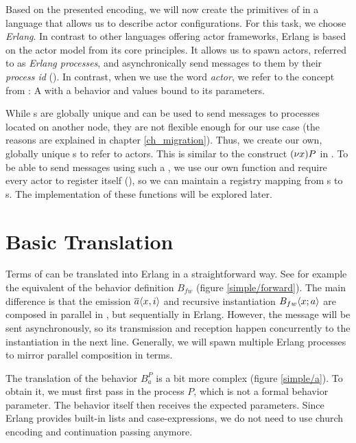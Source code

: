 Based on the presented encoding,
we will now create the primitives of \corejoincalc
in a language that allows us to describe actor configurations.
For this task, we choose \emph{Erlang}.
In contrast to other languages offering actor frameworks,
Erlang is based on the actor model from its core principles.
It allows us to spawn actors, referred to as \emph{Erlang processes},
and asynchronically send messages to them by their \emph{process id} (\PID).
In contrast, when we use the word \emph{actor},
we refer to the concept from \actorpicalc:
A \actorname with a behavior and values bound to its parameters.

While \PID{}s are globally unique and can be used to send messages to
processes located on another node,
they are not flexible enough for our use case
(the reasons are explained in chapter \ref{ch_migration}).
Thus, we create our own, globally unique \actorname{}s to refer to actors.
This is similar to the construct $\anew{x}{P}$ in \actorpicalc.
To be able to send messages using such a \actorname,
we use our own  function and require every actor to register itself
(),
so we can maintain a registry mapping from \actorname{}s to \PID{}s.
The implementation of these functions will be explored later.


\section{Basic Translation}
\label{implementation_basic}

Terms of \actorpicalc can be translated into Erlang in a straightforward way.
See for example the equivalent of the behavior definition $B_{fw}$
(figure \ref{simple/forward}).
The main difference is that the emission $\overline{a}\langle x,i\rangle$
and recursive instantiation $B_{fw} \langle x ; a \rangle$
are composed in parallel in \actorpicalc,
but sequentially in Erlang.
However, the message will be sent asynchronously,
so its transmission and reception happen concurrently to the instantiation
in the next line.
Generally, we will spawn multiple Erlang processes to
mirror parallel composition in \actorpicalc terms.


The translation of the behavior $B_a^P$ is a bit more complex
(figure \ref{simple/a}).
To obtain it, we must first pass in the process $P$,
which is not a formal behavior parameter.
The behavior itself then receives the expected parameters.
Since Erlang provides built-in lists and case-expressions,
we do not need to use church encoding and continuation passing anymore.

